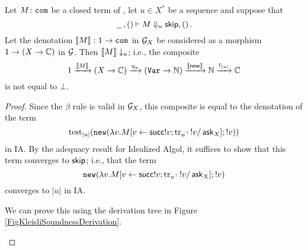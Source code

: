 \begin{proposition}
  Let $M\colon{\mathtt{com}}$ be a closed term of \IAX, let $u\in X^*$ be a sequence and suppose that
  \[
    \,\underline{\hspace{1.5ex}}\,,()\mathbin{\vdash} M\Downarrow_u{\mathsf{skip}},()\,.
    \]
  Let the denotation $\left\llbracket M\right\rrbracket \colon 1 \to {\mathtt{com}}$ in $\mathcal G_X$ be considered as a morphism $1 \to (X \to \mathbb{C})$ in $\mathcal G$.
  Then $\left\llbracket M\right\rrbracket\downarrow_u$; i.e., the composite
  \[
    1 \xrightarrow{\left\llbracket M\right\rrbracket}
    (X \to \mathbb{C}) \xrightarrow{\eta_u}
    ({\mathtt{Var}} \to \mathbb{N}) \xrightarrow{\left\llbracket\operatorname{{\mathsf{new}}}\right\rrbracket}
    \mathbb{N} \xrightarrow{t_{|u|}}
    \mathbb{C}
    \]
  is not equal to $\bot$.
  \label{PropKleisliSoundness}
\end{proposition}
\begin{proof}
  Since the $\beta$ rule is valid in $\mathcal G_X$, this composite is equal to the denotation of the term
  \[
    \operatorname{test}_{|u|}({\mathtt{new}} (\lambda v.M[v\gets \operatorname{{\mathsf{succ}}} !v;\operatorname{tr}_{u^\top} !v/\operatorname{{\mathsf{ask}}}_X];!v))
    \]
  in IA.
  By the adequacy result for Idealized Algol, it suffices to show that this term converges to ${\mathsf{skip}}$; i.e., that the term
  \[
    {\mathtt{new}} (\lambda v.M[v\gets\operatorname{{\mathsf{succ}}} !v;\operatorname{tr}_{u^\top} !v/\operatorname{{\mathsf{ask}}}_X];!v)
    \]
  converges to $|u|$ in IA.
  
  We can prove this using the derivation tree in Figure \ref{FigKleisliSoundnessDerivation}.\qedhere
  \begin{SidewaysFigure}
  \end{SidewaysFigure}
\end{proof}

